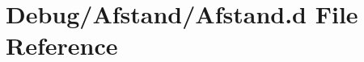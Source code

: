 \hypertarget{_afstand_8d}{}\section{Debug/\+Afstand/\+Afstand.d File Reference}
\label{_afstand_8d}
